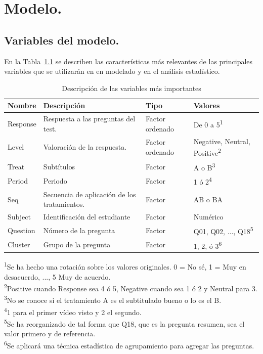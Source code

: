 \documentclass[
  12pt,
  a4paper,
  extrafontsizes,
  onecolumn,
  openright]{memoir}
\begin{document}
\clearpage


\hypertarget{modelo.}{%
\chapter{Modelo.}\label{modelo.}}

\hypertarget{variables}{%
\section{Variables del modelo.}\label{variables}}

En la Tabla~\ref{tbl-variables} se describen las características más
relevantes de las principales variables que se utilizarán en en modelado
y en el análisis estadístico. \footnotesize

\hypertarget{tbl-variables}{}
\setlength{\LTpost}{0mm}
\begin{longtable}{llll}
\caption{\label{tbl-variables}Descripción de las variables más importantes }\tabularnewline

\toprule
Nombre & Descripción & Tipo & Valores \\ 
\midrule
Response & Respuesta a las preguntas del test. & Factor ordenado & De 0 a 5\textsuperscript{1} \\ 
Level & Valoración de la respuesta. & Factor ordenado & Negative, Neutral, Positive\textsuperscript{2} \\ 
Treat & Subtítulos & Factor & A o B\textsuperscript{3} \\ 
Period & Periodo & Factor & 1 ó 2\textsuperscript{4} \\ 
Seq & Secuencia de aplicación de los tratamientos. & Factor & AB o BA \\ 
Subject & Identificación del estudiante & Factor & Numérico \\ 
Question & Número de la pregunta & Factor & Q01, Q02, ..., Q18\textsuperscript{5} \\ 
Cluster & Grupo de la pregunta & Factor & 1, 2, ó 3\textsuperscript{6} \\ 
\bottomrule
\end{longtable}
\begin{minipage}{\linewidth}
\textsuperscript{1}Se ha hecho una rotación sobre los valores originales. 0 = No sé, 1 = Muy en desacuerdo, ..., 5 Muy de acuerdo.\\
\textsuperscript{2}Positive cuando Response sea 4 ó 5, Negative cuando sea 1 ó 2 y Neutral para 3.\\
\textsuperscript{3}No se conoce si el tratamiento A es el subtitulado bueno o lo es el B.\\
\textsuperscript{4}1 para el primer vídeo visto y 2 el segundo.\\
\textsuperscript{5}Se ha reorganizado de tal forma que Q18, que es la pregunta resumen, sea el valor primero y de referencia.\\
\textsuperscript{6}Se aplicará una técnica estadística de agrupamiento para agregar las preguntas.\\
\end{minipage}
\end{document}
